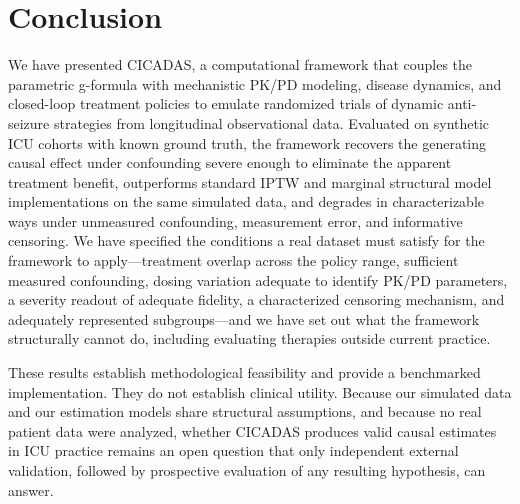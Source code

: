 \section{Conclusion}
\label{sec:conclusion}

We have presented CICADAS, a computational framework that couples the parametric g-formula with
mechanistic PK/PD modeling, disease dynamics, and closed-loop treatment policies to emulate
randomized trials of dynamic anti-seizure strategies from longitudinal observational data. Evaluated
on synthetic ICU cohorts with known ground truth, the framework recovers the generating causal
effect under confounding severe enough to eliminate the apparent treatment benefit, outperforms
standard IPTW and marginal structural model implementations on the same simulated data, and degrades
in characterizable ways under unmeasured confounding, measurement error, and informative censoring.
We have specified the conditions a real dataset must satisfy for the framework to apply---treatment
overlap across the policy range, sufficient measured confounding, dosing variation adequate to
identify PK/PD parameters, a severity readout of adequate fidelity, a characterized censoring
mechanism, and adequately represented subgroups---and we have set out what the framework
structurally cannot do, including evaluating therapies outside current practice.

These results establish methodological feasibility and provide a benchmarked implementation. They do
not establish clinical utility. Because our simulated data and our estimation models share
structural assumptions, and because no real patient data were analyzed, whether CICADAS produces
valid causal estimates in ICU practice remains an open question that only independent external
validation, followed by prospective evaluation of any resulting hypothesis, can answer.
